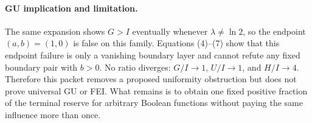 \paragraph{GU implication and limitation.}
The same expansion shows $G>I$ eventually whenever
$\lambda\ne\ln2$, so the endpoint $(a,b)=(1,0)$ is false on this
family.  Equations (4)--(7) show that this endpoint failure is only a
vanishing boundary layer and cannot refute any fixed boundary pair with
$b>0$.  No ratio diverges: $G/I\to1$, $U/I\to1$, and $H/I\to4$.
Therefore this packet removes a proposed uniformity obstruction but does
not prove universal GU or FEI.  What remains is to obtain one fixed
positive fraction of the terminal reserve for arbitrary Boolean
functions without paying the same influence more than once.
